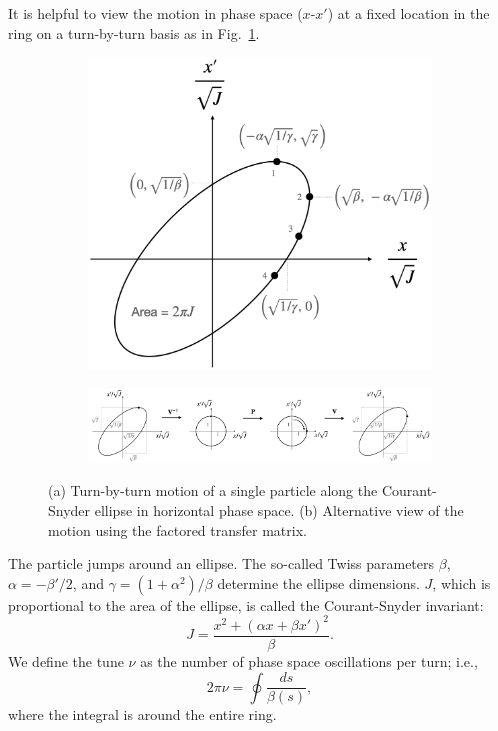 It is helpful to view the motion in phase space ($x$-$x'$) at a fixed location in the ring on a turn-by-turn basis as in Fig.~\ref{fig:cs_ellipse_a}. 
%
\begin{figure}[!p]
    \centering
    \begin{subfigure}{0.6\textwidth}
        \includegraphics[width=\textwidth]{Images/chapter1/cs_ellipse.png}
        \caption{}
        \label{fig:cs_ellipse_a}
    \end{subfigure}
    \vfill
    \vspace*{1.5cm}
    \vfill
    \begin{subfigure}{\textwidth}
        \includegraphics[width=\textwidth]{Images/chapter1/norm_coords.png}
        \caption{}
        \label{fig:_cs_ellipse_b}
    \end{subfigure}
    \caption{(a) Turn-by-turn motion of a single particle along the Courant-Snyder ellipse in horizontal phase space. (b) Alternative view of the motion using the factored transfer matrix.}
    \label{fig:cs_ellipse}
\end{figure}
%
The particle jumps around an ellipse. The so-called Twiss parameters $\beta$, $\alpha = -\beta' / 2$, and $\gamma = (1 + \alpha^2) / \beta$ determine the ellipse dimensions. $J$, which is proportional to the area of the ellipse, is called the Courant-Snyder invariant:
%
\begin{equation}\label{eq:CS invariant}
    J = \frac{x^2 + (\alpha x + \beta x')^2}{\beta}.
\end{equation}
%
We define the tune $\nu$ as the number of phase space oscillations per turn; i.e.,
%
\begin{equation}
    2\pi\nu = \oint{\frac{ds}{\beta(s)}},
\end{equation}
%
where the integral is around the entire ring.

